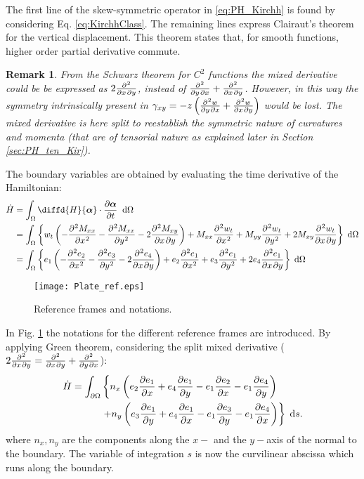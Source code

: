 \documentclass[preprint,12pt]{elsarticle}
\newtheorem{remark}{Remark}
\begin{document}
The first line of the skew-symmetric operator in \eqref{eq:PH_Kirchh} is found by considering Eq. \eqref{eq:KirchhClass}. The remaining lines express Clairaut’s theorem for the vertical displacement. This theorem states that, for smooth functions, higher order partial derivative commute. 
\begin{remark}
	From the Schwarz theorem for $C^2$ functions the mixed derivative could be be expressed as $2 \diffp{}{x,y}$, instead of $\diffp{}{y,x} + \diffp{}{x,y}$. However, in this way the symmetry intrinsically present in $\gamma_{xy} = -z \left( \diffp{w}{y,x} + \diffp{w}{x,y} \right)$ would be lost. The mixed derivative is here split to reestablish the symmetric nature of curvatures and momenta (that are of tensorial nature as explained later in Section \ref{sec:PH_ten_Kir}).
\end{remark}
The boundary variables are obtained by evaluating the time derivative of the Hamiltonian:
\begin{align*}
\dot{H} &= \int_\Omega \diffd{H}{\bm{\alpha}}   \cdot \diffp{\bm{\alpha}}{t} \; \d{\Omega} \\
&= \int_\Omega \left\{ w_t \left(-\diffp[2]{M_{xx}}{x} -\diffp[2]{M_{xx}}{y} - 2 \diffp{M_{xy}}{x,y} \right) + M_{xx} \diffp[2]{w_t}{x} + M_{yy} \diffp[2]{w_t}{y} + 2 M_{xy} \diffp{w_t}{x,y} \right\} \d{\Omega} \\
&= \int_\Omega \left\{ e_1 \left(-\diffp[2]{e_2}{x} -\diffp[2]{e_3}{y} - 2 \diffp{e_4}{x,y}\right) + e_2 \diffp[2]{e_1}{x} + e_3 \diffp[2]{e_1}{y} + 2 e_4 \diffp{e_1}{x,y}  \right\} \d{\Omega}
\end{align*}

\begin{figure}[t]
	\centering
	\texttt{[image: Plate\_ref.eps]}
	\caption{Reference frames and notations.}
	\label{fig:plate_ref}
\end{figure}

In Fig. \ref{fig:plate_ref} the notations for the different reference frames are introduced. By applying Green theorem, considering the split mixed derivative ($2 \diffp{}{x,y} = \diffp{}{x,y} +  \diffp{}{y,x}$):
\begin{align}
\dot{H} = \int_{\partial \Omega}  & \left\{  n_x \left(e_2 \diffp{e_1}{x}  + e_4 \diffp{e_1}{y}  - e_1 \diffp{e_2}{x} - e_1 \diffp{e_4}{y}\right)
\right. \nonumber \\
&   \left. +n_y \left(e_3 \diffp{e_1}{y} + e_4 \diffp{e_1}{x} - e_1 \diffp{e_3}{y} - e_1 \diffp{e_4}{x} \right) \right\} \d{s}.
\end{align}
where $n_x, n_y$ are the components along the $x-$ and the $y-$axis of the normal to the boundary. The variable of integration $s$ is now the curvilinear abscissa which runs along the boundary. 
\end{document}
